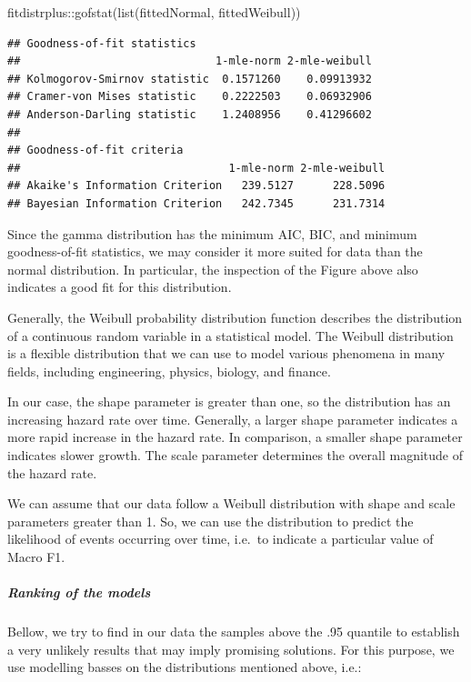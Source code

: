 \documentclass[
]{article}
\newenvironment{Shaded}{\begin{snugshade}}{\end{snugshade}}
\newcommand{\FunctionTok}[1]{\textcolor[rgb]{0.00,0.00,0.00}{#1}}
\newcommand{\NormalTok}[1]{#1}
\newcommand{\SpecialCharTok}[1]{\textcolor[rgb]{0.00,0.00,0.00}{#1}}
\begin{document}
\begin{Shaded}
\begin{Highlighting}[]
\NormalTok{fitdistrplus}\SpecialCharTok{::}\FunctionTok{gofstat}\NormalTok{(}\FunctionTok{list}\NormalTok{(fittedNormal, fittedWeibull))}
\end{Highlighting}
\end{Shaded}

\begin{verbatim}
## Goodness-of-fit statistics
##                              1-mle-norm 2-mle-weibull
## Kolmogorov-Smirnov statistic  0.1571260    0.09913932
## Cramer-von Mises statistic    0.2222503    0.06932906
## Anderson-Darling statistic    1.2408956    0.41296602
## 
## Goodness-of-fit criteria
##                                1-mle-norm 2-mle-weibull
## Akaike's Information Criterion   239.5127      228.5096
## Bayesian Information Criterion   242.7345      231.7314
\end{verbatim}

Since the gamma distribution has the minimum AIC, BIC, and minimum goodness-of-fit statistics, we may consider it more suited for data than the normal distribution. In particular, the inspection of the Figure above also indicates a good fit for this distribution.

Generally, the Weibull probability distribution function describes the distribution of a continuous random variable in a statistical model. The Weibull distribution is a flexible distribution that we can use to model various phenomena in many fields, including engineering, physics, biology, and finance.

In our case, the shape parameter is greater than one, so the distribution has an increasing hazard rate over time. Generally, a larger shape parameter indicates a more rapid increase in the hazard rate. In comparison, a smaller shape parameter indicates slower growth. The scale parameter determines the overall magnitude of the hazard rate.

We can assume that our data follow a Weibull distribution with shape and scale parameters greater than 1. So, we can use the distribution to predict the likelihood of events occurring over time, i.e.~to indicate a particular value of Macro F1.

\hypertarget{ranking-of-the-models-1}{%
\subparagraph{Ranking of the models}\label{ranking-of-the-models-1}}

Bellow, we try to find in our data the samples above the .95 quantile to establish a very unlikely results that may imply promising solutions. For this purpose, we use modelling basses on the distributions mentioned above, i.e.:
\end{document}
